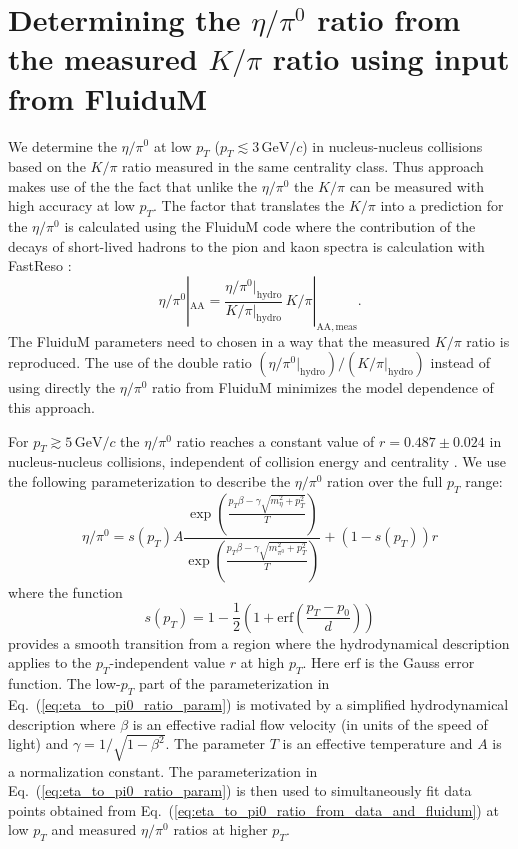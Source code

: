 \documentclass[%
 reprint,
 amsmath,amssymb,
 aps,
prc,
]{revtex4-2}
\begin{document}
\section{Determining the $\eta/\pi^0$ ratio from the measured $K/\pi$ ratio using input from FluiduM}
We determine the $\eta/\pi^0$ at low $p_T$ ($p_T \lesssim 3\,\mathrm{GeV}/c$) in nucleus-nucleus collisions based on the $K/\pi$ ratio measured in the same centrality class. Thus approach makes use of the the fact that unlike the $\eta/\pi^0$ the $K/\pi$ can be measured with high accuracy at low $p_T$. The factor that translates the $K/\pi$ into a prediction for the $\eta/\pi^0$ is calculated using the FluiduM code \cite{Floerchinger:2018pje} where the contribution of the decays of short-lived hadrons to the pion and kaon spectra is calculation with FastReso \cite{Mazeliauskas:2018irt}:
\begin{equation}
\eta/\pi^0|_\mathrm{AA} = \frac{\eta/\pi^0|_\mathrm{hydro}}{K/\pi|_\mathrm{hydro}} \, K/\pi|_\mathrm{AA,meas}.
\label{eq:eta_to_pi0_ratio_from_data_and_fluidum}
\end{equation}
The FluiduM parameters need to chosen in a way that the measured $K/\pi$ ratio is reproduced. The use of the double ratio $(\eta/\pi^0|_\mathrm{hydro})/(K/\pi|_\mathrm{hydro})$ instead of using directly the $\eta/\pi^0$ ratio from FluiduM minimizes the model dependence of this approach.

For $p_T \gtrsim 5\,\mathrm{GeV}/c$ the $\eta/\pi^0$ ratio reaches a constant value of $r = 0.487 \pm 0.024$ in nucleus-nucleus collisions, independent of collision energy and centrality \cite{Ren:2021pzi}. We use the following parameterization to describe the $\eta/\pi^0$ ration over the full $p_T$ range:
\begin{equation}
\eta/\pi^0 = s(p_T) A \frac{\exp\left(\frac{p_T \beta - \gamma \sqrt{m_\eta^2 + p_T^2}}{T} \right)}{\exp\left(\frac{p_T \beta - \gamma \sqrt{m_{\pi^0}^2 + p_T^2}}{T} \right)} + (1-s(p_T)) r
\label{eq:eta_to_pi0_ratio_param}
\end{equation}
where the function
\begin{equation}
  s(p_T) = 1 - \frac{1}{2} \left(1 + \mathrm{erf}\left(\frac{p_T - p_0}{d}\right)\right) 
\end{equation}
provides a smooth transition from a region where the hydrodynamical description applies to the $p_T$-independent value $r$ at high $p_T$. Here $\mathrm{erf}$ is the Gauss error function. The low-$p_T$ part of the parameterization in Eq.~(\ref{eq:eta_to_pi0_ratio_param}) is motivated by a simplified hydrodynamical description where $\beta$ is an effective radial flow velocity (in units of the speed of light) and $\gamma = 1/\sqrt{1-\beta^2}$. The parameter $T$ is an effective temperature and $A$ is a normalization constant. The parameterization in Eq.~(\ref{eq:eta_to_pi0_ratio_param}) is then used to simultaneously fit data points obtained from Eq.~(\ref{eq:eta_to_pi0_ratio_from_data_and_fluidum}) at low $p_T$ and measured $\eta/\pi^0$ ratios at higher $p_T$.
\end{document}
